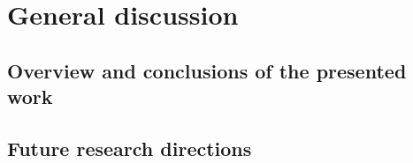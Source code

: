 \newpage{\thispagestyle{empty}\cleardoublepage}
\chapter{General discussion} 
\label{chap:discussion}

\blindtext

\section{Overview and conclusions of the presented work}

%

\section{Future research directions}